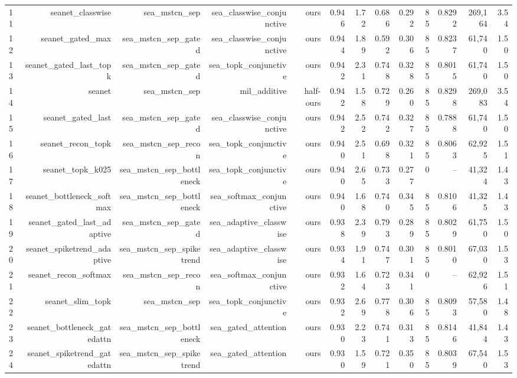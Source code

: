 \begin{table}[t]
\begin{tabular}{lrrrrrrrrrrrr}
11 & seanet\_classwise & sea\_mstcn\_sep & sea\_classwise\_conjunctive & ours & 0.946 & 1.72 & 0.686 & 0.292 & 85 & 0.8292 & 269,164 & 3.54 \\
12 & seanet\_gated\_max & sea\_mstcn\_sep\_gated & sea\_classwise\_conjunctive & ours & 0.944 & 1.89 & 0.592 & 0.306 & 85 & 0.8237 & 61,740 & 1.50 \\
13 & seanet\_gated\_last\_topk & sea\_mstcn\_sep\_gated & sea\_topk\_conjunctive & ours & 0.942 & 2.31 & 0.748 & 0.328 & 85 & 0.8015 & 61,740 & 1.50 \\
14 & seanet & sea\_mstcn\_sep & mil\_additive & half-ours & 0.942 & 1.58 & 0.729 & 0.260 & 85 & 0.8298 & 269,083 & 3.54 \\
15 & seanet\_gated\_last & sea\_mstcn\_sep\_gated & sea\_classwise\_conjunctive & ours & 0.942 & 2.52 & 0.742 & 0.327 & 85 & 0.7888 & 61,740 & 1.50 \\
16 & seanet\_recon\_topk & sea\_mstcn\_sep\_recon & sea\_topk\_conjunctive & ours & 0.940 & 2.51 & 0.698 & 0.321 & 85 & 0.8063 & 62,925 & 1.51 \\
17 & seanet\_topk\_k025 & sea\_mstcn\_sep\_bottleneck & sea\_topk\_conjunctive & ours & 0.940 & 2.65 & 0.733 & 0.277 & 0 & -- & 41,324 & 1.43 \\
18 & seanet\_bottleneck\_softmax & sea\_mstcn\_sep\_bottleneck & sea\_softmax\_conjunctive & ours & 0.940 & 1.68 & 0.740 & 0.345 & 85 & 0.8106 & 41,325 & 1.43 \\
19 & seanet\_gated\_last\_adaptive & sea\_mstcn\_sep\_gated & sea\_adaptive\_classwise & ours & 0.938 & 2.39 & 0.793 & 0.289 & 85 & 0.8029 & 61,750 & 1.50 \\
20 & seanet\_spiketrend\_adaptive & sea\_mstcn\_sep\_spiketrend & sea\_adaptive\_classwise & ours & 0.934 & 1.91 & 0.747 & 0.301 & 85 & 0.8010 & 67,030 & 1.53 \\
21 & seanet\_recon\_softmax & sea\_mstcn\_sep\_recon & sea\_softmax\_conjunctive & ours & 0.932 & 1.64 & 0.723 & 0.341 & 0 & -- & 62,926 & 1.51 \\
22 & seanet\_slim\_topk & sea\_mstcn\_sep & sea\_topk\_conjunctive & ours & 0.932 & 2.69 & 0.778 & 0.306 & 85 & 0.8093 & 57,580 & 1.48 \\
23 & seanet\_bottleneck\_gatedattn & sea\_mstcn\_sep\_bottleneck & sea\_gated\_attention & ours & 0.930 & 2.23 & 0.741 & 0.313 & 85 & 0.8146 & 41,844 & 1.43 \\
24 & seanet\_spiketrend\_gatedattn & sea\_mstcn\_sep\_spiketrend & sea\_gated\_attention & ours & 0.930 & 1.59 & 0.721 & 0.350 & 85 & 0.8039 & 67,540 & 1.53 \\

\end{tabular}
\end{table}

